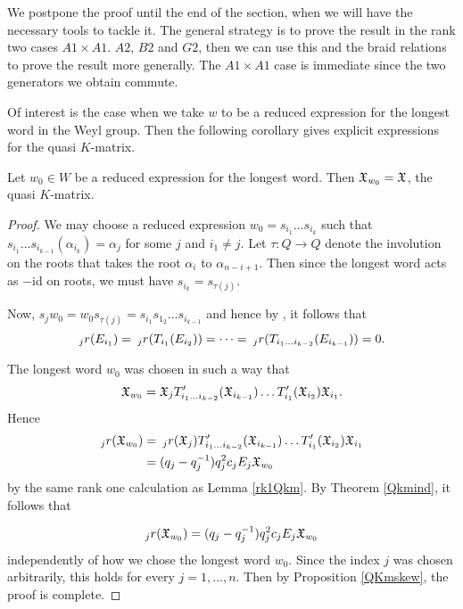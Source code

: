 \documentclass[a4 paper, 10pt]{article}
\begin{document}
We postpone the proof until the end of the section, when we will have the necessary tools to tackle it.
The general strategy is to prove the result in the rank two cases $A1 \times A1$. $A2$, $B2$ and $G2$, then we can use this and the braid relations to prove the result more generally. The $A1 \times A1$ case is immediate since the two generators we obtain commute. 

Of interest is the case when we take $w$ to be a reduced expression for the longest word in the Weyl group. 
Then the following corollary gives explicit expressions for the quasi $K$-matrix.

\begin{corollary}
	Let $w_0 \in W$ be a reduced expression for the longest word. Then $\mathfrak{X}_{w_0} = \mathfrak{X}$, the quasi $K$-matrix.
\end{corollary}

\begin{proof}
	We may choose a reduced expression $w_0 = s_{i_1} \dots s_{i_k}$ such that $s_{i_1} \dots s_{i_{k-1}}(\alpha_{i_k}) = \alpha_j$ for some $j$ and $i_1 \neq j$. 
	Let $\tau: Q \rightarrow Q$ denote the involution on the roots that takes the root $\alpha_i$ to $\alpha_{n-i+1}$.
	Then since the longest word acts as $-$id on roots, we must have $s_{i_k} = s_{\tau(j)}$. 

	Now, $s_jw_0 = w_0s_{\tau(j)} = s_{i_1}s_{1_2}\dots s_{i_{k-1}}$ and hence by \cite[8.26, (4)]{b-Jantzen96}, it follows that 
	\[ {}_{j}r(E_{i_1}) = \: {}_{j}r(T_{i_1}(E_{i_2})) = \dots = \: {}_{j}r(T_{i_1\dots i_{k-2}}(E_{i_{k-1}})) = 0.\]
	
	The longest word $w_0$ was chosen in such a way that
		\begin{equation}
			\mathfrak{X}_{w_0} = \mathfrak{X}_j T^{\prime}_{i_1\dots i_{k-2}}(\mathfrak{X}_{i_{k-1}}) \dots T^{\prime}_{i_1}(\mathfrak{X}_{i_2})\mathfrak{X}_{i_1}.
		\end{equation}
	Hence 
		\begin{align*}
			{}_{j}r(\mathfrak{X}_{w_0}) 	&= \: {}_{j}r(\mathfrak{X}_j) T^{\prime}_{i_1 \dots i_{k-2}}(\mathfrak{X}_{i_{k-1}}) \dots T^{\prime}_{i_1}(\mathfrak{X}_{i_2}) \mathfrak{X}_{i_1}\\
								&= (q_j - q_j^{-1})q_j^2c_jE_j\mathfrak{X}_{w_0}
		\end{align*}		
	by the same rank one calculation as Lemma \ref{rk1Qkm}. By Theorem \ref{Qkmind}, it follows that 
	
		\begin{equation}
			{}_{j}r(\mathfrak{X}_{w_0}) = (q_j - q_j^{-1})q_j^2c_jE_j\mathfrak{X}_{w_0}
		\end{equation}		 
	independently of how we chose the longest word $w_0$. Since the index $j$ was chosen arbitrarily, this holds for every $j = 1, \dots, n$. Then by Proposition \ref{QKmskew}, the proof is complete.
\end{proof}
\end{document}
